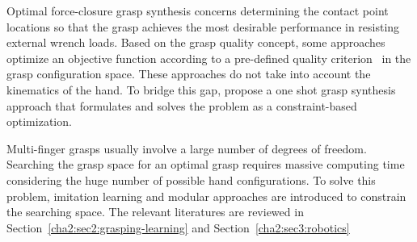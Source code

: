 Optimal force-closure grasp synthesis concerns determining the contact point locations so that the grasp achieves the most desirable performance in resisting external wrench loads.
Based on the grasp quality concept, some approaches optimize an objective function according to a pre-defined quality criterion~\citep{Zhu2003,Zhu04} in the grasp configuration space.
These approaches do not take into account the kinematics of the hand. To bridge this gap, \citet{S.ElKhoury2012} propose a one shot grasp synthesis approach that formulates and solves the problem as a constraint-based optimization.

Multi-finger grasps usually involve a large number of degrees of freedom.
Searching the grasp space for an optimal grasp requires massive computing time considering the huge number of possible hand configurations. To solve this problem, imitation learning and modular approaches are introduced to constrain the searching space. The relevant literatures are reviewed in Section~\ref{cha2:sec2:grasping-learning} and Section~\ref{cha2:sec3:robotics}

